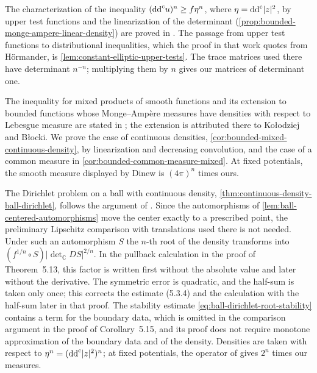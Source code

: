 The characterization of the inequality $(\mathrm{dd}^{\mathrm{c}} u)^n\geq f\eta^n$, where $\eta=\mathrm{dd}^{\mathrm{c}}|z|^2$, by upper test functions and the linearization of the determinant (\cref{prop:bounded-monge-ampere-linear-density}) are proved in \cite[Proposition 1.5 and Lemma 1.7]{EGZ10ViscosityV1}. The passage from upper test functions to distributional inequalities, which the proof in that work quotes from H\"ormander, is \cref{lem:constant-elliptic-upper-tests}. The trace matrices used there have determinant $n^{-n}$; multiplying them by $n$ gives our matrices of determinant one.

The inequality for mixed products of smooth functions and its extension to bounded functions whose Monge--Amp\`ere measures have densities with respect to Lebesgue measure are stated in \cite[Theorems 1.1--1.2]{Din07MixedV1}; the extension is attributed there to Ko\l{}odziej and B\l{}ocki. We prove the case of continuous densities, \cref{cor:bounded-mixed-continuous-density}, by linearization and decreasing convolution, and the case of a common measure in \cref{cor:bounded-common-measure-mixed}. At fixed potentials, the smooth measure displayed by Dinew is $(4\pi)^n$ times ours.

The Dirichlet problem on a ball with continuous density, \cref{thm:continuous-density-ball-dirichlet}, follows the argument of \cite[Theorems 5.13--5.14 and Corollary 5.15]{GZ17}. Since the automorphisms of \cref{lem:ball-centered-automorphisms} move the center exactly to a prescribed point, the preliminary Lipschitz comparison with translations used there is not needed. Under such an automorphism $S$ the $n$-th root of the density transforms into $(f^{1/n}\circ S)|\det_{\mathbb C}DS|^{2/n}$. In the pullback calculation in the proof of Theorem~5.13, this factor is written first without the absolute value and later without the derivative. The symmetric error is quadratic, and the half-sum is taken only once; this corrects the estimate (5.3.4) and the calculation with the half-sum later in that proof. The stability estimate \eqref{eq:ball-dirichlet-root-stability} contains a term for the boundary data, which is omitted in the comparison argument in the proof of Corollary~5.15, and its proof does not require monotone approximation of the boundary data and of the density. Densities are taken with respect to $\eta^n=(\mathrm{dd}^{\mathrm{c}}|z|^2)^n$; at fixed potentials, the operator of \cite{GZ17} gives $2^n$ times our measures.


